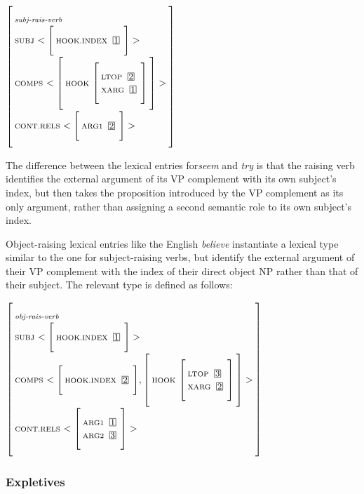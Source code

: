 \documentclass[12pt]{article}
\newcommand{\avmplus}[1]{{\setlength{\arraycolsep}{0.8mm}	
                       \renewcommand{\arraystretch}{1.1} %
                       \left[ 			
                       \begin{array}{l}
                       \\[-2mm] #1 \\[-2mm] \\
                       \end{array} 		
                       \right]
                    }}
\newcommand{\att}[1]{{\mbox{\scriptsize {\bf #1}}}}
\newcommand{\attval}[2]{{\mbox{\scriptsize #1}\ {{#2}}}}
\newcommand{\attvallist}[2]{{\mbox{\scriptsize #1}\ {<{#2}>}}}
\newcommand{\ind}[1]{{\setlength{\fboxsep}{0.25mm} \: \fbox{{\small #1}} \:}}
\begin{document}
$\avmplus{\att{\it subj-rais-verb}\\
          \attvallist{SUBJ}{
          \avmplus{\attval{HOOK.INDEX}{\ind{1}}}}\\

          \attvallist{COMPS}{
                      \avmplus{\attval{HOOK} {
                                       \avmplus{\attval{LTOP}{\ind{2}}\\
                                                 \attval{XARG}{\ind{1}}}}}}\\
          \attvallist{CONT.RELS}{
          \avmplus{\attval{ARG1}{\ind{2}}}}}$


The difference between the lexical entries for{\it seem} and {\it try} is
that the raising verb identifies the external argument of its VP complement
with its own subject's index, but then takes the proposition introduced by
the VP complement as its only argument, rather than assigning a second
semantic role to its own subject's index.

Object-raising lexical entries like the English {\it believe} instantiate
a lexical type similar to the one for subject-raising verbs, but identify 
the external argument of their VP complement with the index of their direct
object NP rather than that of their subject.  The relevant type is defined
as follows:

$\avmplus{\att{\it obj-rais-verb}\\
          \attvallist{SUBJ}{
          \avmplus{\attval{HOOK.INDEX}{\ind{1}}}}\\

          \attvallist{COMPS}{
                      \avmplus{\attval{HOOK.INDEX}{\ind{2}}},
                      \avmplus{\attval{HOOK} {
                                       \avmplus{\attval{LTOP}{\ind{3}}\\
                                                \attval{XARG}{\ind{2}}}}}}\\
          \attvallist{CONT.RELS}{
                           \avmplus{\attval{ARG1}{\ind{1}}\\
                                    \attval{ARG2}{\ind{3}}}}}$

\subsubsection{Expletives}
\end{document}
